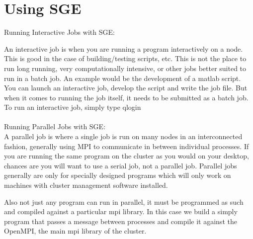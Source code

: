 \chapter{Using SGE}


Running Interactive Jobs with SGE:

An interactive job is when you are running a program interactively on a node. This is good in the case of building/testing scripts, etc. This is not the place to run long running, very computationally intensive, or other jobs better suited to run in a batch job. An example would be the development of a matlab script. You can launch an interactive job, develop the script and write the job file. But when it comes to running the job itself, it needs to be submitted as a batch job. To run an interactive job, simply type qlogin
\\~\\
Running Parallel Jobs with SGE:\\
 A parallel job is where a single job is run on many nodes in an interconnected fashion, generally using MPI to communicate in between individual processes. If you are running the same program on the cluster as you would on your desktop, chances are you will want to use a serial job, not a parallel job. Parallel jobs generally are only for specially designed programs which will only work on machines with cluster management software installed.

Also not just any program can run in parallel, it must be programmed as such and compiled against a particular mpi library. In this case we build a simply program that passes a message between processes and compile it against the OpenMPI, the main mpi library of the cluster.